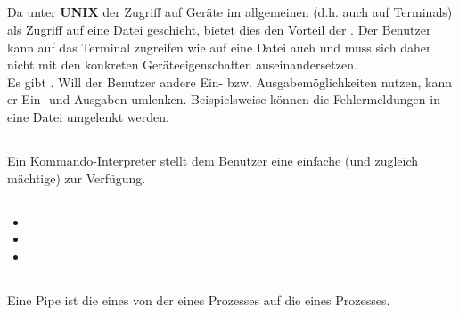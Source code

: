 \subsection{}
\begin{answer}
Da unter \textbf{UNIX} der Zugriff auf Geräte im allgemeinen (d.h. auch auf Terminals) als Zugriff
auf eine Datei geschieht, bietet dies den Vorteil der . Der Benutzer
kann auf das Terminal zugreifen wie auf eine Datei auch und muss sich daher nicht mit den konkreten Geräteeigenschaften auseinandersetzen. \\
Es gibt . Will der Benutzer andere Ein- bzw. Ausgabemöglichkeiten nutzen, kann er Ein- und Ausgaben umlenken. Beispielsweise können die Fehlermeldungen in eine Datei umgelenkt werden.
\end{answer}

\subsection{}
\begin{answer}
Ein Kommando-Interpreter stellt dem Benutzer eine einfache (und zugleich mächtige)  zur Verfügung.
\end{answer}

\subsection{}
\begin{answer}
\begin{itemize}
\item {}
\item {}
\item {}
\end{itemize}

\end{answer}

\subsection{}
\begin{answer}
Eine Pipe ist die  eines  von der  eines Prozesses auf die  eines Prozesses.
\end{answer}

